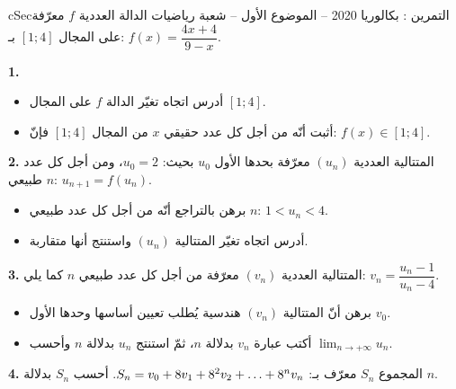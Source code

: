 \documentclass[12pt,a4paper]{article}
\newenvironment{BOX}[2]{\begin{otherlanguage}{english}\begin{arbox}{#1}{#2}}{\end{arbox}\end{otherlanguage}}
\newcounter{exo}
\newenvironment{tamrin}[1]{\stepcounter{exo}\begin{BOX}{cSec}{التمرين \theexo: #1}}{\end{BOX}}
\renewcommand{\dots}{\mathinner{\ldotp\ldotp\ldotp}}
\newcommand{\limn}{\displaystyle\lim_{n\to+\infty}}
\newenvironment{sq}{\begin{itemize}[leftmargin=2.4em,itemsep=3pt]}{\end{itemize}}
\newcommand{\qa}{\item[(أ)]}\newcommand{\qb}{\item[(ب)]}\newcommand{\qc}{\item[(جـ)]}\newcommand{\qd}{\item[(د)]}\newcommand{\qe}{\item[(هـ)]}
\newcommand{\QQ}[1]{\par\smallskip\textbf{#1.} }
\begin{document}
\begin{tamrin}{بكالوريا 2020 -- الموضوع الأول -- شعبة رياضيات}
الدالة العددية $f$ معرّفة على المجال $[1;4]$ بـ: $f(x)=\dfrac{4x+4}{9-x}$.
\QQ{1}
\begin{sq}
\qa أدرس اتجاه تغيّر الدالة $f$ على المجال $[1;4]$.
\qb أثبت أنّه من أجل كل عدد حقيقي $x$ من المجال $[1;4]$ فإنّ: $f(x)\in[1;4]$.
\end{sq}
\QQ{2} المتتالية العددية $(u_n)$ معرّفة بحدها الأول $u_0$ بحيث: $u_0=2$، ومن أجل كل عدد طبيعي $n$: $u_{n+1}=f(u_n)$.
\begin{sq}
\qa برهن بالتراجع أنّه من أجل كل عدد طبيعي $n$: $1<u_n<4$.
\qb أدرس اتجاه تغيّر المتتالية $(u_n)$ واستنتج أنها متقاربة.
\end{sq}
\QQ{3} المتتالية العددية $(v_n)$ معرّفة من أجل كل عدد طبيعي $n$ كما يلي: $v_n=\dfrac{u_n-1}{u_n-4}$.
\begin{sq}
\qa برهن أنّ المتتالية $(v_n)$ هندسية يُطلب تعيين أساسها وحدها الأول $v_0$.
\qb أكتب عبارة $v_n$ بدلالة $n$، ثمّ استنتج $u_n$ بدلالة $n$ وأحسب $\limn u_n$.
\end{sq}
\QQ{4} المجموع $S_n$ معرّف بـ: $S_n=v_0+8v_1+8^2v_2+\dots+8^nv_n$. أحسب $S_n$ بدلالة $n$.
\end{tamrin}
\end{document}
